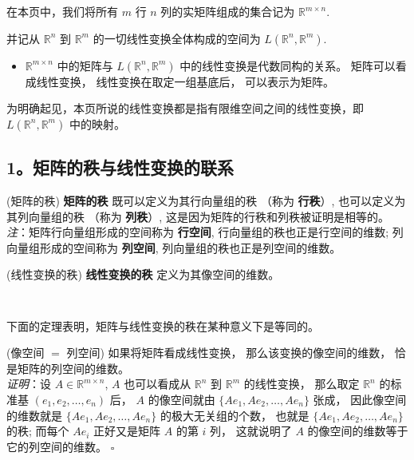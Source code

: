 

在本页中，我们将所有 $m$ 行 $n$ 列的实矩阵组成的集合记为 $\mathbb{R}^{m\times n}.$

并记从 $\mathbb{R}^{n}$ 到 $\mathbb{R}^{m}$ 的一切线性变换全体构成的空间为 $L(\mathbb{R}^{n},\mathbb{R}^{m}).$
\begin{itemize}
\item $\mathbb{R}^{m\times n}$ 中的矩阵与 $L(\mathbb{R}^{n},\mathbb{R}^{m})$
中的线性变换是代数同构的关系。 矩阵可以看成线性变换， 线性变换在取定一组基底后， 可以表示为矩阵。 
\end{itemize}

为明确起见，本页所说的线性变换都是指有限维空间之间的线性变换，即 $L(\mathbb{R}^{n},\mathbb{R}^{m})$ 中的映射。


\subsection{1。矩阵的秩与线性变换的联系}

\begin{definition}{(矩阵的秩)}\label{def_linmat_2}
\textbf{矩阵的秩} 既可以定义为其行向量组的秩 （称为 \textbf{行秩}）, 也可以定义为其列向量组的秩 （称为 \textbf{列秩}）,
这是因为矩阵的行秩和列秩被证明是相等的。 \\

\textsl{注}：矩阵行向量组形成的空间称为 \textbf{行空间}, 行向量组的秩也正是行空间的维数;
列向量组形成的空间称为 \textbf{列空间}, 列向量组的秩也正是列空间的维数。
\end{definition}



\begin{definition}{(线性变换的秩)}
\textbf{线性变换的秩} 定义为其像空间的维数。
\end{definition} 
\verb| |

下面的定理表明，矩阵与线性变换的秩在某种意义下是等同的。
\begin{theorem}{(像空间 $=$ 列空间)}\label{the_linmat_1}
 如果将矩阵看成线性变换， 那么该变换的像空间的维数， 恰是矩阵的列空间的维数。\\

\textsl{ 证明}：设 $A\in\mathbb{R}^{m\times n}$, $A$ 也可以看成从 $\mathbb{R}^{n}$ 到 $\mathbb{R}^{m}$
的线性变换， 那么取定 $\mathbb{R}^{n}$ 的标准基 $(e_{1},e_{2},\ldots,e_{n})$ 后，
$A$ 的像空间就由 $\{Ae_{1},Ae_{2},\ldots,Ae_{n}\}$ 张成， 因此像空间的维数就是 $\{Ae_{1},Ae_{2},\ldots,Ae_{n}\}$
的极大无关组的个数， 也就是 $\{Ae_{1},Ae_{2},\ldots,Ae_{n}\}$ 的秩; 而每个 $Ae_{i}$
正好又是矩阵 $A$ 的第 $i$ 列， 这就说明了 $A$ 的像空间的维数等于它的列空间的维数。 $\square$
\end{theorem}


